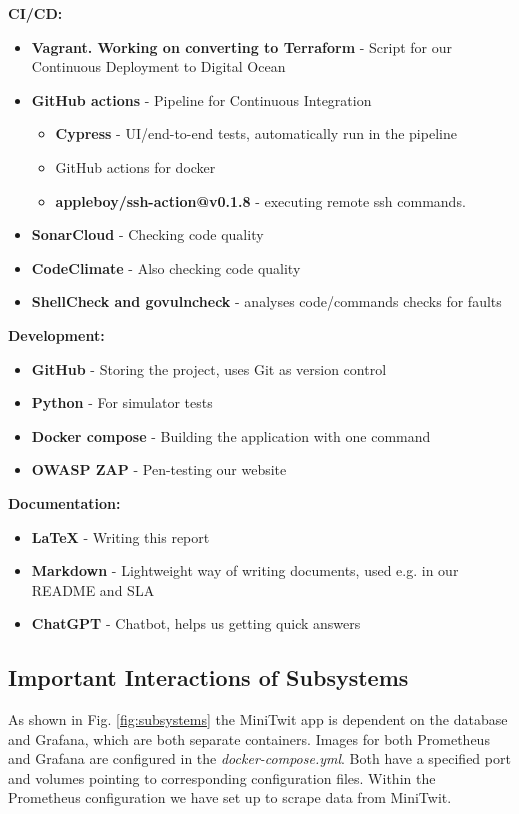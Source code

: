 \textbf{CI/CD:}
\begin{itemize}
    \item \textbf{Vagrant. Working on converting to Terraform} - Script for our Continuous Deployment to Digital Ocean
    \item \textbf{GitHub actions} - Pipeline for Continuous Integration
    \begin{itemize}
        \item \textbf{Cypress} - UI/end-to-end tests, automatically run in the pipeline %
        \item GitHub actions for docker
        \item \textbf{appleboy/ssh-action@v0.1.8} - executing remote ssh commands.
    \end{itemize}
    \item \textbf{SonarCloud} - Checking code quality 
    \item \textbf{CodeClimate} - Also checking code quality %
    \item \textbf{ShellCheck and govulncheck} - analyses code/commands checks for faults %
\end{itemize}
\textbf{Development:}
\begin{itemize}
    \item \textbf{GitHub} - Storing the project, uses Git as version control
    \item \textbf{Python} - For simulator tests
    \item \textbf{Docker compose} - Building the application with one command
    \item \textbf{OWASP ZAP} - Pen-testing our website
\end{itemize}
\textbf{Documentation:}
\begin{itemize}
    \item \textbf{LaTeX} - Writing this report
    \item \textbf{Markdown} - Lightweight way of writing documents, used e.g. in our README and SLA
    \item \textbf{ChatGPT} - Chatbot, helps us getting quick answers %
\end{itemize}

\subsection{Important Interactions of Subsystems}
As shown in Fig. \ref{fig:subsystems} the MiniTwit app is dependent on the database and Grafana, which are both separate containers. Images for both Prometheus and Grafana are configured in the \textit{docker-compose.yml}. Both have a specified port and volumes pointing to corresponding configuration files. Within the Prometheus configuration we have set up to scrape data from MiniTwit.

